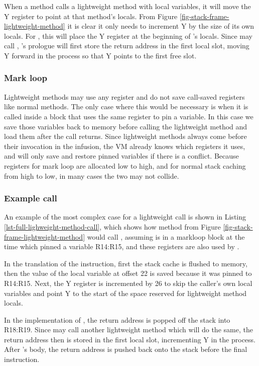 When a method calls a lightweight method with local variables, it will move the Y register to point at that method's locals. From Figure \ref{fig-stack-frame-lightweight-method} it is clear it only needs to increment Y by the size of its own locals. For , this will place the Y register at the beginning of 's locals. Since  may call , 's prologue will first store the return address in the first local slot, moving Y forward in the process so that Y points to the first free slot.

\subsubsection{Mark loop}
Lightweight methods may use any register and do not save call-saved registers like normal methods. The only case where this would be necessary is when it is called inside a  block that uses the same register to pin a variable. In this case we save those variables back to memory before calling the lightweight method and load them after the call returns. Since lightweight methods always come before their invocation in the infusion, the VM already knows which registers it uses, and will only save and restore pinned variables if there is a conflict. Because registers for mark loop are allocated low to high, and for normal stack caching from high to low, in many cases the two may not collide.

\subsubsection{Example call}
An example of the most complex case for a lightweight call is shown in Listing \ref{lst-full-lighweight-method-call}, which shows how method  from Figure \ref{fig-stack-frame-lightweight-method} would call , assuming  is in a markloop block at the time which pinned a variable R14:R15, and these registers are also used by .

In the translation of the  instruction, first the stack cache is flushed to memory, then the value of the local variable at offset 22 is saved because it was pinned to R14:R15. Next, the Y register is incremented by 26 to skip the caller's own local variables and point Y to the start of the space reserved for lightweight method locals.

In the implementation of , the return address is popped off the stack into R18:R19. Since  may call another lightweight method which will do the same, the return address then is stored in the first local slot, incrementing Y in the process. After 's body, the return address is pushed back onto the stack before the final  instruction.

